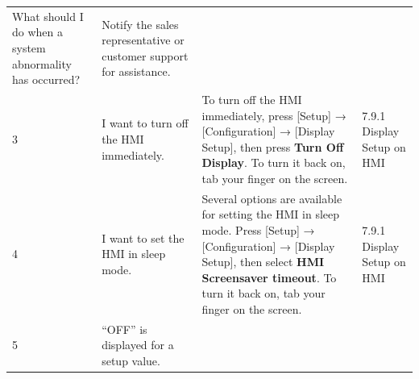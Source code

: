 \begin{longtable}[]{@{}|l|l|l|l|@{}}
\begin{minipage}[t]{0.30\columnwidth}
What should I do when a system abnormality has occurred?\strut
\end{minipage} & \begin{minipage}[t]{0.33\columnwidth}\raggedright
Notify the sales representative or customer support for
assistance.\strut
\end{minipage} & \begin{minipage}[t]{0.17\columnwidth}\raggedright
\strut
\end{minipage}\tabularnewline
 \begin{minipage}[t]{0.08\columnwidth}\raggedright
3\strut
\end{minipage} & \begin{minipage}[t]{0.30\columnwidth}\raggedright
I want to turn off the HMI immediately.\strut
\end{minipage} & \begin{minipage}[t]{0.33\columnwidth}\raggedright
To turn off the HMI immediately, press {[}Setup{]} → {[}Configuration{]}
→ {[}Display Setup{]}, then press \textbf{Turn Off Display}. To turn it
back on, tab your finger on the screen.\strut
\end{minipage} & \begin{minipage}[t]{0.17\columnwidth}\raggedright
7.9.1 Display Setup on HMI\strut
\end{minipage}\tabularnewline
 \begin{minipage}[t]{0.08\columnwidth}\raggedright
4\strut
\end{minipage} & \begin{minipage}[t]{0.30\columnwidth}\raggedright
I want to set the HMI in sleep mode.\strut
\end{minipage} & \begin{minipage}[t]{0.33\columnwidth}\raggedright
Several options are available for setting the HMI in sleep mode. Press
{[}Setup{]} → {[}Configuration{]} → {[}Display Setup{]}, then select
\textbf{HMI Screensaver timeout}. To turn it back on, tab your finger on
the screen.\strut
\end{minipage} & \begin{minipage}[t]{0.17\columnwidth}\raggedright
7.9.1 Display Setup on HMI\strut
\end{minipage}\tabularnewline
 \begin{minipage}[t]{0.08\columnwidth}\raggedright
5\strut
\end{minipage} & \begin{minipage}[t]{0.30\columnwidth}\raggedright
``OFF'' is displayed for a setup value.\strut
\end{minipage} & \begin{minipage}[t]{0.33\columnwidth}\raggedright

\end{minipage}
\end{longtable}
